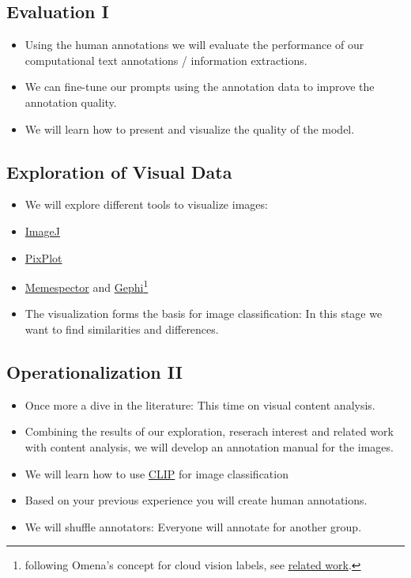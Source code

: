\documentclass[
  letterpaper,
  DIV=11,
  numbers=noendperiod]{scrartcl}
\providecommand{\tightlist}{%
  \setlength{\itemsep}{0pt}\setlength{\parskip}{0pt}}\usepackage{longtable,booktabs,array}
\begin{document}
\hypertarget{evaluation-i}{%
\subsection{Evaluation I}\label{evaluation-i}}

\begin{itemize}
\tightlist
\item
  Using the human annotations we will evaluate the performance of our
  computational text annotations / information extractions.
\item
  We can fine-tune our prompts using the annotation data to improve the
  annotation quality.
\item
  We will learn how to present and visualize the quality of the model.
\end{itemize}

\hypertarget{exploration-of-visual-data}{%
\subsection{Exploration of Visual
Data}\label{exploration-of-visual-data}}

\begin{itemize}
\tightlist
\item
  We will explore different tools to visualize images:
\item
  \href{https://imagej.nih.gov/ij/download.html}{ImageJ}
\item
  \href{https://github.com/YaleDHLab/pix-plot}{PixPlot}
\item
  \href{https://github.com/jason-chao/memespector-gui}{Memespector} and
  \href{https://gephi.org/}{Gephi}\footnote{following Omena's concept
    for cloud vision labels, see \href{related-work.qmd}{related work}.}
\item
  The visualization forms the basis for image classification: In this
  stage we want to find similarities and differences.
\end{itemize}

\hypertarget{operationalization-ii}{%
\subsection{Operationalization II}\label{operationalization-ii}}

\begin{itemize}
\tightlist
\item
  Once more a dive in the literature: This time on visual content
  analysis.
\item
  Combining the results of our exploration, reserach interest and
  related work with content analysis, we will develop an annotation
  manual for the images.
\item
  We will learn how to use \href{https://openai.com/research/clip}{CLIP}
  for image classification
\item
  Based on your previous experience you will create human annotations.
\item
  We will shuffle annotators: Everyone will annotate for another group.
\end{itemize}
\end{document}
